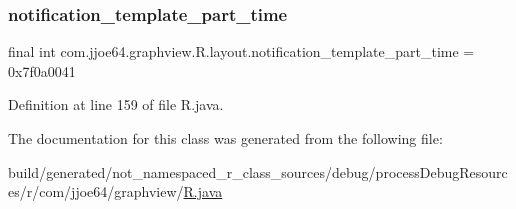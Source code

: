 \subsubsection{\texorpdfstring{notification\_template\_part\_time}{notification\_template\_part\_time}}
{\footnotesize\ttfamily final int com.\+jjoe64.\+graphview.\+R.\+layout.\+notification\+\_\+template\+\_\+part\+\_\+time = 0x7f0a0041\hspace{0.3cm}{\ttfamily [static]}}



Definition at line 159 of file R.\+java.



The documentation for this class was generated from the following file\+:\begin{DoxyCompactItemize}
\item 
build/generated/not\+\_\+namespaced\+\_\+r\+\_\+class\+\_\+sources/debug/process\+Debug\+Resources/r/com/jjoe64/graphview/\mbox{\hyperlink{com_2jjoe64_2graphview_2_r_8java}{R.\+java}}\end{DoxyCompactItemize}
